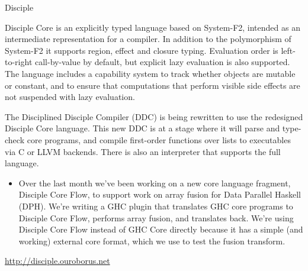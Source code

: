 \begin{hcarentry}{Disciple}
\makeheader

Disciple Core is an explicitly typed language based on System-F2, intended as an intermediate representation for a compiler. In addition to the polymorphism of System-F2 it supports region, effect and closure typing. Evaluation order is left-to-right call-by-value by default, but explicit lazy evaluation is also supported. The language includes a capability system to track whether objects are mutable or constant, and to ensure that computations that perform visible side effects are not suspended with lazy evaluation.

The Disciplined Disciple Compiler (DDC) is being rewritten to use the redesigned Disciple Core language. This new DDC is at a stage where it will parse and type-check core programs, and compile first-order functions over lists to executables via C or LLVM backends. There is also an interpreter that supports the full language.

\WhatsNew

\begin{itemize}
\item Over the last month we've been working on a new core language fragment, Disciple Core Flow, to support work on array fusion for Data Parallel Haskell (DPH). We're writing a GHC plugin that translates GHC core programs to Disciple Core Flow, performs array fusion, and translates back. We're using Disciple Core Flow instead of GHC Core directly because it has a simple (and working) external core format, which we use to test the fusion transform.
\end{itemize}

\FurtherReading
  \url{http://disciple.ouroborus.net}
\end{hcarentry}
